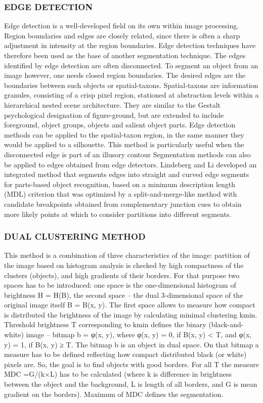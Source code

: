 \subsubsection{EDGE DETECTION}
Edge detection is a well-developed field on its own within image processing. Region boundaries and edges are closely related, since there is often a sharp adjustment in intensity at the region boundaries. Edge detection techniques have therefore been used as the base of another segmentation technique.
The edges identified by edge detection are often disconnected. To segment an object from an image however, one needs closed region boundaries. The desired edges are the boundaries between such objects or spatial-taxons.
Spatial-taxons are information granules, consisting of a crisp pixel region, stationed at abstraction levels within a hierarchical nested scene architecture. They are similar to the Gestalt psychological designation of figure-ground, but are extended to include foreground, object groups, objects and salient object parts. Edge detection methods can be applied to the spatial-taxon region, in the same manner they would be applied to a silhouette. This method is particularly useful when the disconnected edge is part of an illusory contour
Segmentation methods can also be applied to edges obtained from edge detectors. Lindeberg and Li developed an integrated method that segments edges into straight and curved edge segments for parts-based object recognition, based on a minimum description length (MDL) criterion that was optimized by a split-and-merge-like method with candidate breakpoints obtained from complementary junction cues to obtain more likely points at which to consider partitions into different segments.

\subsubsection{DUAL CLUSTERING METHOD}
This method is a combination of three characteristics of the image: partition of the image based on histogram analysis is checked by high compactness of the clusters (objects), and high gradients of their borders. For that purpose two spaces has to be introduced: one space is the one-dimensional histogram of brightness H = H(B), the second space – the dual 3-dimensional space of the original image itself B = B(x, y). The first space allows to measure how compact is distributed the brightness of the image by calculating minimal clustering kmin. Threshold brightness T corresponding to kmin defines the binary (black-and-white) image – bitmap b = φ(x, y), where φ(x, y) = 0, if B(x, y) < T, and φ(x, y) = 1, if B(x, y) ≥ T. The bitmap b is an object in dual space. On that bitmap a measure has to be defined reflecting how compact distributed black (or white) pixels are. So, the goal is to find objects with good borders. For all T the measure MDC =G/(k×L) has to be calculated (where k is difference in brightness between the object and the background, L is length of all borders, and G is mean gradient on the borders). Maximum of MDC defines the segmentation.

